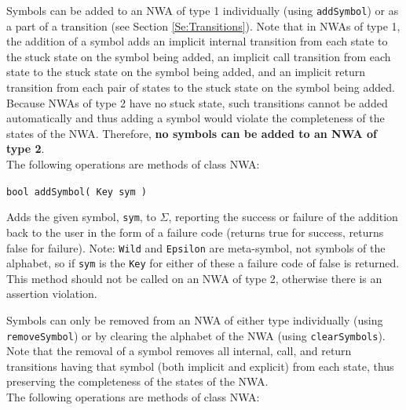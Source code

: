 \documentclass{llncs}
\begin{document}
Symbols can be added to an NWA of type 1 individually (using \texttt{addSymbol}) or as a part of a transition (see Section \ref{Se:Transitions}).  Note that in NWAs of type 1, the addition of a symbol adds an implicit internal transition from each state to the stuck state on the symbol being added, an implicit call transition from each state to the stuck state on the symbol being added, and an implicit return transition from each pair of states to the stuck state on the symbol being added.  Because NWAs of type 2 have no stuck state, such transitions cannot be added automatically and thus adding a symbol would violate the completeness of the states of the NWA.  Therefore, \textbf{no symbols can be added to an NWA of type 2}. \\
 
\noindent The following operations are methods of class NWA:

\begin{description}

  \item\texttt{bool addSymbol( Key sym )}

    Adds the given symbol, \texttt{sym}, to $\Sigma$, reporting the success or failure of the addition back to the user in the form of a failure code (returns true for success, returns false for failure).  Note: \texttt{Wild} and \texttt{Epsilon} are meta-symbol, not symbols of the alphabet, so if \texttt{sym} is the \texttt{Key} for either of these a failure code of false is returned.  This method should not be called on an NWA of type 2, otherwise there is an assertion violation. \\

\end{description}

Symbols can only be removed from an NWA of either type individually (using \texttt{removeSymbol}) or by clearing the alphabet of the NWA (using \texttt{clearSymbols}).  Note that the removal of a symbol removes all internal, call, and return transitions having that symbol (both implicit and explicit) from each state, thus preserving the completeness of the states of the NWA. \\ 

\noindent The following operations are methods of class NWA:
\end{document}

